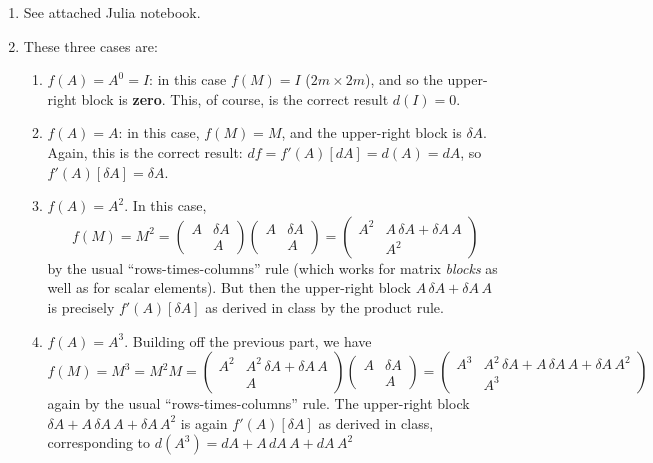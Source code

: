 \documentclass[10pt,oneside]{article}
\begin{document}
\begin{enumerate}

    \item See attached Julia notebook. 

    \item These three cases are:
    \begin{enumerate}
    \item $f(A) = A^0 = I$: in this case $f(M) = I$ ($2m \times 2m$), and so the upper-right block is \textbf{zero}.  This, of course, is the correct result $d(I) = 0$.
    \item $f(A) = A$: in this case, $f(M) = M$, and the upper-right block is $\delta A$.  Again, this is the correct result: $df = f'(A)[dA] = d(A) = dA$, so $f'(A)[\delta A] = \delta A$.
    \item $f(A) = A^2$.  In this case, 
    $$
    f(M) = M^2 = \begin{pmatrix} A & \delta A \\ & A \end{pmatrix} \begin{pmatrix} A & \delta A \\ & A \end{pmatrix} = \begin{pmatrix} A^2 & A \, \delta A + \delta A \, A \\ & A^2 \end{pmatrix}
    $$
    by the usual ``rows-times-columns'' rule (which works for matrix \emph{blocks} as well as for scalar elements).  But then the upper-right block $A \, \delta A + \delta A \, A$ is precisely $f'(A)[\delta A]$ as derived in class by the product rule.
    
    \item $f(A) = A^3$.  Building off the previous part, we have 
    $$
    f(M) = M^3 = M^2 M = \begin{pmatrix} A^2 & A^2 \, \delta A + \delta A \, A \\ & A \end{pmatrix} \begin{pmatrix} A & \delta A \\ & A \end{pmatrix} = \begin{pmatrix} A^3 & A^2 \, \delta A + A \, \delta A \, A + \delta A \, A^2 \\ & A^3 \end{pmatrix}
    $$
    again by the usual ``rows-times-columns'' rule.  The upper-right block $\delta A + A \, \delta A \, A + \delta A \, A^2$ is again  $f'(A)[\delta A]$ as derived in class, corresponding to $d(A^3) = d A + A \, d A \, A + d A \, A^2$
    \end{enumerate}


\end{enumerate}
\end{document}
